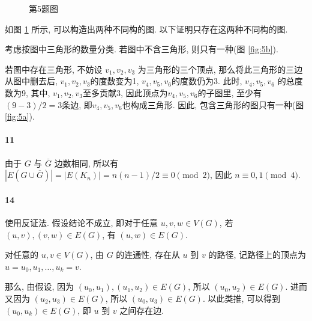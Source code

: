 \documentclass{ctexart}
\begin{document}
\begin{figure}[ht]
    \centering
    \quad
    \caption{第5题图}
    \label{fig:5}
\end{figure}

如图 \ref{fig:5} 所示, 可以构造出两种不同构的图.
以下证明只存在这两种不同构的图.

考虑按图中三角形的数量分类. 若图中不含三角形, 则只有一种(图 \ref{fig:5b}).

若图中存在三角形, 不妨设 $v_1,v_2,v_3$ 为三角形的三个顶点,
那么将此三角形的三边从图中删去后, $v_1,v_2,v_3$的度数变为1,
$v_4,v_5,v_6$的度数仍为3. 此时, $v_4,v_5,v_6$ 的总度数为9,
其中, $v_1,v_2,v_3$至多贡献3, 因此顶点为$v_4,v_5,v_6$的子图里,
至少有$(9-3)/2=3$条边, 即$v_4,v_5,v_6$也构成三角形.
因此, 包含三角形的图只有一种(图 \ref{fig:5a}).

\paragraph*{11} 由于 $G$ 与 $\overline{G}$ 边数相同, 
所以有 $|E(G\cup \overline{G})| =|E(K_n)| =n(n-1)/2 \equiv 0 \pmod 2$, 因此 $n\equiv 0, 1 \pmod 4$.

\paragraph*{14} 使用反证法. 假设结论不成立, 即对于任意 $u,v,w\in V(G)$,
若 $(u,v),(v,w)\in E(G)$, 有 $(u,w)\in E(G)$.

对任意的 $u,v\in V(G)$, 由 $G$ 的连通性, 存在从 $u$ 到 $v$ 的路径,
记路径上的顶点为 $u=u_0,u_1,\ldots,u_k=v$. 

那么, 由假设, 因为 $(u_0,u_1),(u_1,u_2)\in E(G)$, 所以 $(u_0,u_2)\in E(G)$.
进而又因为 $(u_2,u_3)\in E(G)$, 所以 $(u_0,u_3)\in E(G)$.
以此类推, 可以得到 $(u_0,u_k)\in E(G)$, 即 $u$ 到 $v$ 之间存在边.
\end{document}

